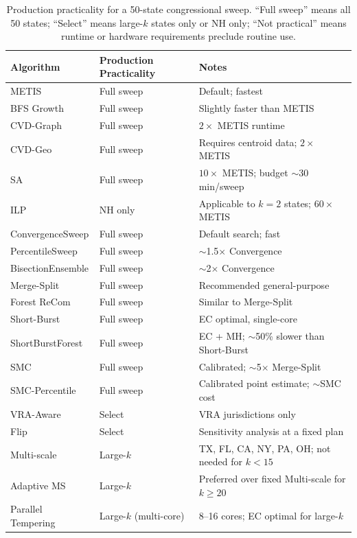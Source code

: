 \begin{table}[ht]
\centering
\caption{%
  Production practicality for a 50-state congressional sweep.
  ``Full sweep'' means all 50 states; ``Select'' means large-$k$ states only
  or NH only; ``Not practical'' means runtime or hardware requirements
  preclude routine use.
}
\label{tab:practical}
\small
\begin{tabular}{@{}lll@{}}
\toprule
Algorithm & Production Practicality & Notes \\
\midrule
METIS        & Full sweep & Default; fastest \\
BFS Growth   & Full sweep & Slightly faster than METIS \\
CVD-Graph    & Full sweep & $2\times$ METIS runtime \\
CVD-Geo      & Full sweep & Requires centroid data; $2\times$ METIS \\
SA           & Full sweep & $10\times$ METIS; budget $\sim$30 min/sweep \\
ILP          & NH only    & Applicable to $k=2$ states; $60\times$ METIS \\
\midrule
ConvergenceSweep  & Full sweep & Default search; fast \\
PercentileSweep   & Full sweep & $\sim$1.5$\times$ Convergence \\
BisectionEnsemble & Full sweep & $\sim$2$\times$ Convergence \\
Merge-Split       & Full sweep & Recommended general-purpose \\
Forest ReCom      & Full sweep & Similar to Merge-Split \\
Short-Burst       & Full sweep & EC optimal, single-core \\
ShortBurstForest  & Full sweep & EC + MH; $\sim$50\% slower than Short-Burst \\
SMC               & Full sweep & Calibrated; $\sim$5$\times$ Merge-Split \\
SMC-Percentile    & Full sweep & Calibrated point estimate; $\sim$SMC cost \\
VRA-Aware         & Select     & VRA jurisdictions only \\
Flip              & Select     & Sensitivity analysis at a fixed plan \\
Multi-scale       & Large-$k$  & TX, FL, CA, NY, PA, OH; not needed for $k<15$ \\
Adaptive MS       & Large-$k$  & Preferred over fixed Multi-scale for $k \geq 20$ \\
Parallel Tempering & Large-$k$ (multi-core) & 8--16 cores; EC optimal for large-$k$ \\
\bottomrule
\end{tabular}
\end{table}

